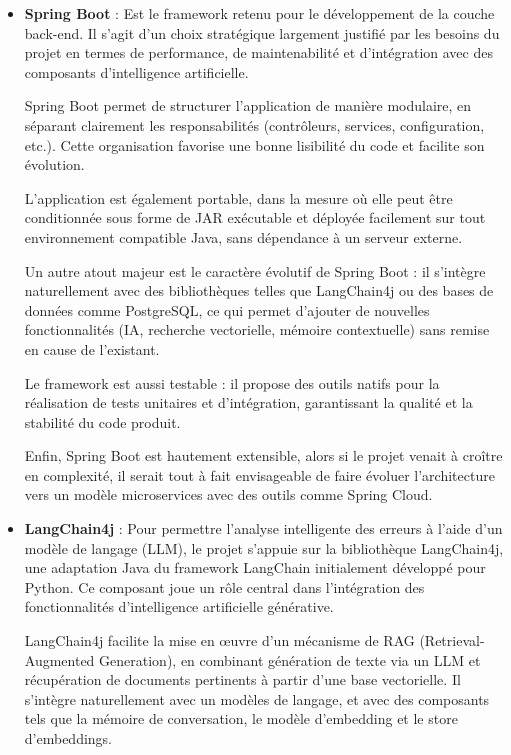 \documentclass[12pt,a4paper]{report}
\begin{document}
	\begin{itemize}
		
		\item \textbf{Spring Boot} : Est le framework retenu pour le développement de la couche back-end. Il s’agit d’un choix stratégique largement justifié par les besoins du projet en termes de performance, de maintenabilité et d’intégration avec des composants d’intelligence artificielle.
		
		Spring Boot permet de structurer l’application de manière modulaire, en séparant clairement les responsabilités (contrôleurs, services, configuration, etc.). Cette organisation favorise une bonne lisibilité du code et facilite son évolution.
		
		L’application est également portable, dans la mesure où elle peut être conditionnée sous forme de JAR exécutable et déployée facilement sur tout environnement compatible Java, sans dépendance à un serveur externe.
		
		Un autre atout majeur est le caractère évolutif de Spring Boot : il s’intègre naturellement avec des bibliothèques telles que LangChain4j ou des bases de données comme PostgreSQL, ce qui permet d’ajouter de nouvelles fonctionnalités (IA, recherche vectorielle, mémoire contextuelle) sans remise en cause de l’existant.
		
		Le framework est aussi testable : il propose des outils natifs pour la réalisation de tests unitaires et d’intégration, garantissant la qualité et la stabilité du code produit.
		
		Enfin, Spring Boot est hautement extensible, alors si le projet venait à croître en complexité, il serait tout à fait envisageable de faire évoluer l’architecture vers un modèle microservices avec des outils comme Spring Cloud.
		
		\item \textbf{LangChain4j} : Pour permettre l’analyse intelligente des erreurs à l’aide d’un modèle de langage (LLM), le projet s’appuie sur la bibliothèque LangChain4j, une adaptation Java du framework LangChain initialement développé pour Python. Ce composant joue un rôle central dans l’intégration des fonctionnalités d’intelligence artificielle générative.
		
		LangChain4j facilite la mise en œuvre d’un mécanisme de RAG (Retrieval-Augmented Generation), en combinant génération de texte via un LLM et récupération de documents pertinents à partir d’une base vectorielle. Il s’intègre naturellement avec un modèles de langage, et avec des composants tels que la mémoire de conversation, le modèle d’embedding et le store d’embeddings.
		

\end{itemize}
\end{document}
